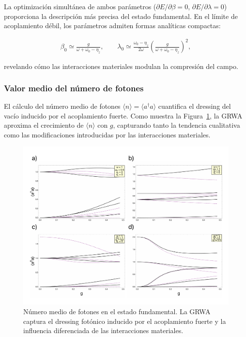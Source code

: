 \documentclass[onecolumn,notitlepage,letterpaper,aps,pra,12pt]{article}
\numberwithin{equation}{section}
\begin{document}
La optimización simultánea de ambos parámetros ($\partial E/\partial\beta = 0$, $\partial E/\partial\lambda = 0$) proporciona la descripción más precisa del estado fundamental. En el límite de acoplamiento débil, los parámetros admiten formas analíticas compactas:

\begin{gather}
\beta_{0} \simeq \frac{g}{\omega + \omega_{0}-\eta_{z}}, \qquad \lambda_{0} \simeq \frac{\omega_{0}-\eta_{z}}{2\omega} \left( \frac{g}{\omega + \omega_{0} -\eta_{z}} \right)^{2},
\end{gather}

revelando cómo las interacciones materiales modulan la compresión del campo.

\subsubsection{Valor medio del número de fotones}

El cálculo del número medio de fotones $\langle n \rangle = \langle a^{\dagger}a \rangle$ cuantifica el dressing del vacío inducido por el acoplamiento fuerte. Como muestra la Figura~\ref{fig:Expectation Value}, la GRWA aproxima el crecimiento de $\langle n \rangle$ con $g$, capturando tanto la tendencia cualitativa como las modificaciones introducidas por las interacciones materiales.

\begin{figure}[H]
    \centering
    \includegraphics[width=0.9\linewidth]{Images APS v1/Promedio.pdf}
    \caption{Número medio de fotones en el estado fundamental. La GRWA captura el dressing fotónico inducido por el acoplamiento fuerte y la influencia diferenciada de las interacciones materiales.}
    \label{fig:Expectation Value}
\end{figure}
\end{document}
